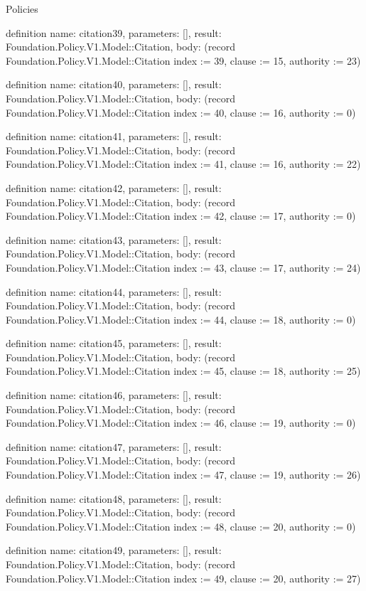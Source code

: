 \begin{lexlean}{Policies}
\begin{semanticmodule}
definition{
  name: citation39,
  parameters: [],
  result: Foundation.Policy.V1.Model::Citation,
  body: (record Foundation.Policy.V1.Model::Citation {index := 39, clause := 15, authority := 23})
}

definition{
  name: citation40,
  parameters: [],
  result: Foundation.Policy.V1.Model::Citation,
  body: (record Foundation.Policy.V1.Model::Citation {index := 40, clause := 16, authority := 0})
}

definition{
  name: citation41,
  parameters: [],
  result: Foundation.Policy.V1.Model::Citation,
  body: (record Foundation.Policy.V1.Model::Citation {index := 41, clause := 16, authority := 22})
}

definition{
  name: citation42,
  parameters: [],
  result: Foundation.Policy.V1.Model::Citation,
  body: (record Foundation.Policy.V1.Model::Citation {index := 42, clause := 17, authority := 0})
}

definition{
  name: citation43,
  parameters: [],
  result: Foundation.Policy.V1.Model::Citation,
  body: (record Foundation.Policy.V1.Model::Citation {index := 43, clause := 17, authority := 24})
}

definition{
  name: citation44,
  parameters: [],
  result: Foundation.Policy.V1.Model::Citation,
  body: (record Foundation.Policy.V1.Model::Citation {index := 44, clause := 18, authority := 0})
}

definition{
  name: citation45,
  parameters: [],
  result: Foundation.Policy.V1.Model::Citation,
  body: (record Foundation.Policy.V1.Model::Citation {index := 45, clause := 18, authority := 25})
}

definition{
  name: citation46,
  parameters: [],
  result: Foundation.Policy.V1.Model::Citation,
  body: (record Foundation.Policy.V1.Model::Citation {index := 46, clause := 19, authority := 0})
}

definition{
  name: citation47,
  parameters: [],
  result: Foundation.Policy.V1.Model::Citation,
  body: (record Foundation.Policy.V1.Model::Citation {index := 47, clause := 19, authority := 26})
}

definition{
  name: citation48,
  parameters: [],
  result: Foundation.Policy.V1.Model::Citation,
  body: (record Foundation.Policy.V1.Model::Citation {index := 48, clause := 20, authority := 0})
}

definition{
  name: citation49,
  parameters: [],
  result: Foundation.Policy.V1.Model::Citation,
  body: (record Foundation.Policy.V1.Model::Citation {index := 49, clause := 20, authority := 27})
}


\end{semanticmodule}
\end{lexlean}
